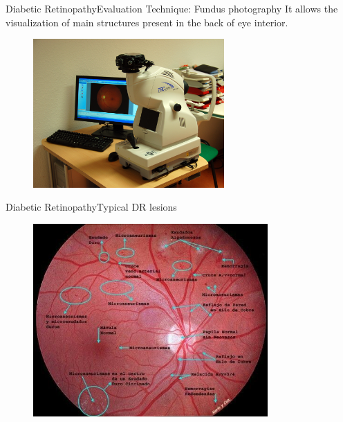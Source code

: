 \documentclass{beamer}
\begin{document}
\begin{frame}{Diabetic Retinopathy}{Evaluation Technique: Fundus photography}
It allows the visualization of main structures present in the back of eye interior.
\begin{figure}[p]
\centering
\includegraphics[width=0.65\textwidth]{fundus_camera.jpg}
\end{figure}
\end{frame}


\begin{frame}{Diabetic Retinopathy}{Typical DR lesions}
\begin{figure}[p]
	\centering
	\includegraphics[width=0.80\textwidth]{diabetic-retinopathy-typical-lesions.jpg}
\end{figure}
\end{frame}
\end{document}
